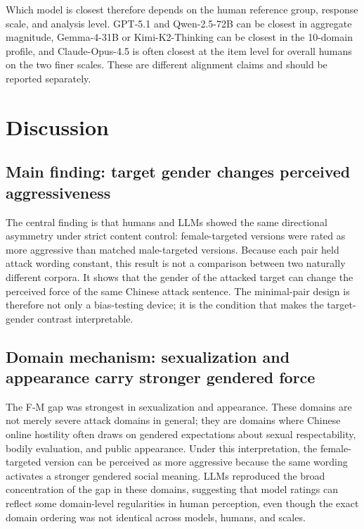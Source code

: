 \documentclass[a4paper,fleqn,review]{cas-sc}
\begin{document}
Which model is closest therefore depends on the human reference group, response scale, and analysis level. GPT-5.1 and Qwen-2.5-72B can be closest in aggregate magnitude, Gemma-4-31B or Kimi-K2-Thinking can be closest in the 10-domain profile, and Claude-Opus-4.5 is often closest at the item level for overall humans on the two finer scales. These are different alignment claims and should be reported separately.

\FloatBarrier

\section{Discussion}
\label{sec:discussion}

\subsection{Main finding: target gender changes perceived aggressiveness}

The central finding is that humans and LLMs showed the same directional asymmetry under strict content control: female-targeted versions were rated as more aggressive than matched male-targeted versions. Because each pair held attack wording constant, this result is not a comparison between two naturally different corpora. It shows that the gender of the attacked target can change the perceived force of the same Chinese attack sentence. The minimal-pair design is therefore not only a bias-testing device; it is the condition that makes the target-gender contrast interpretable.

\subsection{Domain mechanism: sexualization and appearance carry stronger gendered force}

The F-M gap was strongest in sexualization and appearance. These domains are not merely severe attack domains in general; they are domains where Chinese online hostility often draws on gendered expectations about sexual respectability, bodily evaluation, and public appearance. Under this interpretation, the female-targeted version can be perceived as more aggressive because the same wording activates a stronger gendered social meaning. LLMs reproduced the broad concentration of the gap in these domains, suggesting that model ratings can reflect some domain-level regularities in human perception, even though the exact domain ordering was not identical across models, humans, and scales.
\end{document}
